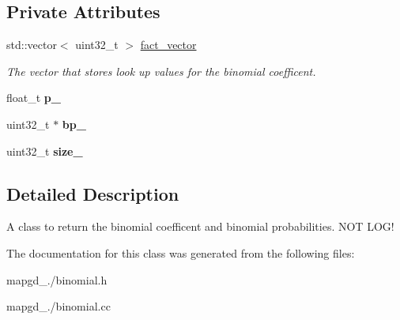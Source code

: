 \subsection*{Private Attributes}
\begin{DoxyCompactItemize}
\item 
\hypertarget{classbinomial_a52bbbb5322a8be20b000c53a1825430f}{std\-::vector$<$ uint32\-\_\-t $>$ \hyperlink{classbinomial_a52bbbb5322a8be20b000c53a1825430f}{fact\-\_\-vector}}\label{classbinomial_a52bbbb5322a8be20b000c53a1825430f}

\begin{DoxyCompactList}\small\item\em The vector that stores look up values for the binomial coefficent. \end{DoxyCompactList}\item 
\hypertarget{classbinomial_a536b89288f62e47096d686f077637501}{float\-\_\-t {\bfseries p\-\_\-}}\label{classbinomial_a536b89288f62e47096d686f077637501}

\item 
\hypertarget{classbinomial_af5d3a3b07fb9929b83d872d29392b8ed}{uint32\-\_\-t $\ast$ {\bfseries bp\-\_\-}}\label{classbinomial_af5d3a3b07fb9929b83d872d29392b8ed}

\item 
\hypertarget{classbinomial_abdc55611ccc89152dd92beea6567336b}{uint32\-\_\-t {\bfseries size\-\_\-}}\label{classbinomial_abdc55611ccc89152dd92beea6567336b}

\end{DoxyCompactItemize}


\subsection{Detailed Description}
A class to return the binomial coefficent and binomial probabilities. N\-O\-T L\-O\-G! 

The documentation for this class was generated from the following files\-:\begin{DoxyCompactItemize}
\item 
mapgd\-\_./binomial.\-h\item 
mapgd\-\_./binomial.\-cc\end{DoxyCompactItemize}
